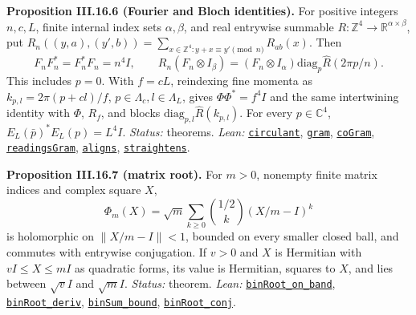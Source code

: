 \documentclass[
  letterpaper,
  11pt]{article}
\newcounter{none} %
\begin{document}
\textbf{Proposition III.16.6 (Fourier and Bloch identities).} For
positive integers \(n,c,L\), finite internal index sets
\(\alpha,\beta\), and real entrywise summable
\(R:\mathbb Z^4\to\mathbb R^{\alpha\times\beta}\), put
\(R_n((y,a),(y',b))=\sum_{x\in\mathbb Z^4:y+x\equiv y'\pmod n}R_{ab}(x)\).
Then
\[F_nF_n^*=F_n^*F_n=n^4I,\qquad R_n(F_n\otimes I_\beta)=(F_n\otimes I_\alpha)\mathrm{diag}_p\hat R(2\pi p/n).\]
This includes \(p=0\). With \(f=cL\), reindexing fine momenta as
\(k_{p,l}=2\pi(p+cl)/f\), \(p\in\Lambda_c,l\in\Lambda_L\), gives
\(\Phi\Phi^*=f^4I\) and the same intertwining identity with \(\Phi\),
\(R_f\), and blocks \(\mathrm{diag}_{p,l}\hat R(k_{p,l})\). For every
\(p\in\mathbb C^4\), \(E_L(\bar p)^*E_L(p)=L^4I\). \emph{Status:}
theorems. \emph{Lean:}
\href{https://github.com/yang-mills-group/OpenAI-YM-20261028/blob/3456e5e75cf8d4cd558955a5c7638fba2d68f464/YM/CellFourier/Circulant.lean\#L88-L104}{\texttt{circulant}},
\href{https://github.com/yang-mills-group/OpenAI-YM-20261028/blob/3456e5e75cf8d4cd558955a5c7638fba2d68f464/YM/CellFourier/Mesh.lean\#L117-L119}{\texttt{gram}},
\href{https://github.com/yang-mills-group/OpenAI-YM-20261028/blob/3456e5e75cf8d4cd558955a5c7638fba2d68f464/YM/CellFourier/Mesh.lean\#L121-L127}{\texttt{coGram}},
\href{https://github.com/yang-mills-group/OpenAI-YM-20261028/blob/3456e5e75cf8d4cd558955a5c7638fba2d68f464/YM/CellFourier/Shuttle.lean\#L66-L75}{\texttt{readingsGram}},
\href{https://github.com/yang-mills-group/OpenAI-YM-20261028/blob/3456e5e75cf8d4cd558955a5c7638fba2d68f464/YM/CellFourier/Shuttle.lean\#L110-L129}{\texttt{aligns}},
\href{https://github.com/yang-mills-group/OpenAI-YM-20261028/blob/3456e5e75cf8d4cd558955a5c7638fba2d68f464/YM/CellFourier/Alias.lean\#L41-L53}{\texttt{straightens}}.

\textbf{Proposition III.16.7 (matrix root).} For \(m>0\), nonempty
finite matrix indices and complex square \(X\),
\[\Phi_m(X)=\sqrt m\sum_{k\ge0}\binom{1/2}{k}(X/m-I)^k\] is holomorphic
on \(\|X/m-I\|<1\), bounded on every smaller closed ball, and commutes
with entrywise conjugation. If \(v>0\) and \(X\) is Hermitian with
\(vI\le X\le mI\) as quadratic forms, its value is Hermitian, squares to
\(X\), and lies between \(\sqrt vI\) and \(\sqrt mI\). \emph{Status:}
theorem. \emph{Lean:}
\href{https://github.com/yang-mills-group/OpenAI-YM-20261028/blob/3456e5e75cf8d4cd558955a5c7638fba2d68f464/YM/Work/F07/MatrixRoot.lean\#L185-L198}{\texttt{binRoot\_on\_band}},
\href{https://github.com/yang-mills-group/OpenAI-YM-20261028/blob/3456e5e75cf8d4cd558955a5c7638fba2d68f464/YM/Work/F07/MatrixRoot.lean\#L127-L130}{\texttt{binRoot\_deriv}},
\href{https://github.com/yang-mills-group/OpenAI-YM-20261028/blob/3456e5e75cf8d4cd558955a5c7638fba2d68f464/YM/Work/F07/MatrixRoot.lean\#L116-L123}{\texttt{binSum\_bound}},
\href{https://github.com/yang-mills-group/OpenAI-YM-20261028/blob/3456e5e75cf8d4cd558955a5c7638fba2d68f464/YM/Work/F07/MatrixRoot.lean\#L138-L143}{\texttt{binRoot\_conj}}.
\end{document}

